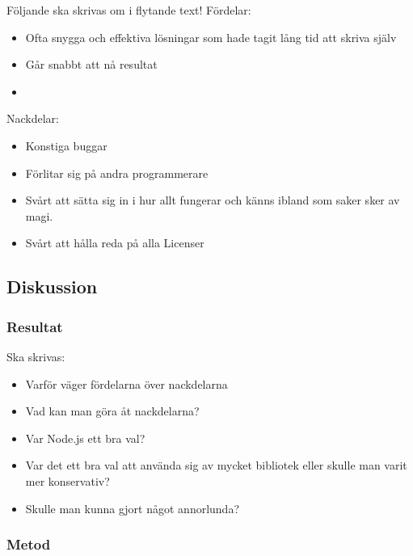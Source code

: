 Följande ska skrivas om i flytande text!
Fördelar:
\begin{itemize}
	\item Ofta snygga och effektiva lösningar som hade tagit lång tid att skriva själv
	\item Går snabbt att nå resultat
	\item 
\end{itemize}
Nackdelar:
\begin{itemize}
	\item Konstiga buggar
	\item Förlitar sig på andra programmerare
	\item Svårt att sätta sig in i hur allt fungerar och känns ibland som saker sker av magi.
	\item Svårt att hålla reda på alla Licenser
\end{itemize}


\subsection{Diskussion}

\subsubsection{Resultat}

Ska skrivas:
\begin{itemize}
	\item Varför väger fördelarna över nackdelarna
	\item Vad kan man göra åt nackdelarna?
	\item Var Node.js ett bra val?
	\item Var det ett bra val att använda sig av mycket bibliotek eller skulle man varit mer konservativ?
	\item Skulle man kunna gjort något annorlunda?
\end{itemize}

\subsubsection{Metod}

